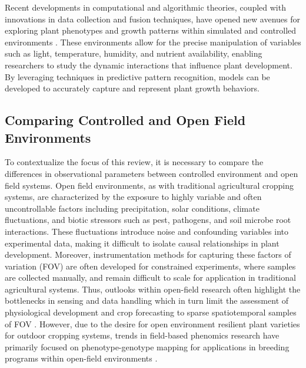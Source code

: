 \documentclass{article}
\begin{document}
Recent developments in computational and algorithmic theories, coupled with innovations in data collection and fusion techniques, have opened new avenues for exploring plant phenotypes and growth patterns within simulated and controlled environments \cite{10.1111/tpj.14722}. These environments allow for the precise manipulation of variables such as light, temperature, humidity, and nutrient availability, enabling researchers to study the dynamic interactions that influence plant development. By leveraging techniques in predictive pattern recognition, models can be developed to accurately capture and represent plant growth behaviors.

\subsection{Comparing Controlled and Open Field Environments}
To contextualize the focus of this review, it is necessary to compare the differences in observational parameters between controlled environment and open field systems. 
Open field environments, as with traditional agricultural cropping systems, are characterized by the exposure to highly variable and often uncontrollable factors including precipitation, solar conditions, climate fluctuations, and biotic stressors such as pest, pathogens, and soil microbe root interactions. 
These fluctuations introduce noise and confounding variables into experimental data, making it difficult to isolate causal relationships in plant development. 
Moreover, instrumentation methods for capturing these factors of variation (FOV) are often developed for constrained experiments, where samples are collected manually, and remain difficult to scale for application in traditional agricultural systems. Thus, outlooks within open-field research often highlight the bottlenecks in sensing and data handling which in turn limit the assessment of physiological development and crop forecasting to sparse spatiotemporal samples of FOV \cite{10.1093/jxb/erv345,WHITE2012101}.    
However, due to the desire for open environment resilient plant varieties for outdoor cropping systems, trends in field-based phenomics research have primarily focused on phenotype-genotype mapping for applications in breeding programs within open-field environments \cite{DEERY20219871989,nph.15817,ARAUS201452}. 
\end{document}
